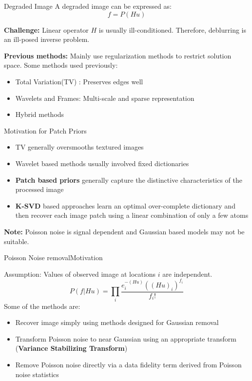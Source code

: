 \documentclass{beamer}
\begin{document}
\begin{frame}{Degraded Image}
A degraded image can be expressed as:
\[
    f = P(Hu)
\]

\vspace{0.5cm}

\textbf{Challenge: }Linear operator $H$ is usually ill-conditioned. Therefore, deblurring is an ill-posed inverse problem.

\vspace{0.5cm}

\textbf{Previous methods: } Mainly use regularization methods to restrict solution space. Some methods used previously:
\begin{itemize}
    \item Total Variation(TV) : Preserves edges well
    \item Wavelets and Frames: Multi-scale and sparse representation
    \item Hybrid methods
\end{itemize}

\end{frame}

\begin{frame}{Motivation for Patch Priors}
\begin{itemize}
    \item TV generally oversmooths textured images
    \item Wavelet based methods usually involved fixed dictionaries
    \item \textbf{Patch based priors} generally capture the distinctive characteristics of the processed image
    \item \textbf{K-SVD} based approaches learn an optimal over-complete dictionary and then recover each image patch using a linear combination of only a few atoms
\end{itemize}

\textbf{Note: }Poisson noise is signal dependent and Gaussian based models may not be suitable.
\end{frame}

\begin{frame}{Poisson Noise removal}{Motivation}

Assumption: Values of observed image at locations ${i}$ are independent.
\[
P(f|Hu) = \prod_{i}{}\frac{e^{-(Hu)}_i   ((Hu)_i)^{f_i}}{f_i !}
\]
Some of the methods are:
\begin{itemize}
    \item Recover image simply using methods designed for Gaussian removal
    \item Transform Poisson noise to near Gaussian using an appropriate transform (\textbf{Variance Stabilizing Transform})
    \item Remove Poisson noise directly via a data fidelity term derived from Poisson noise statistics
\end{itemize}
    
\end{frame}
\end{document}
